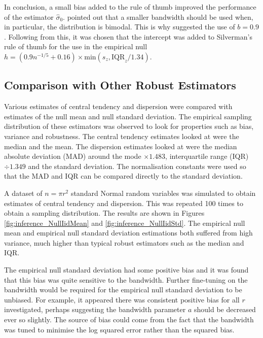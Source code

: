 In conclusion, a small bias added to the rule of thumb improved the performance of the estimator $\widehat{\sigma}_0$. \cite{silverman1986density} pointed out that a smaller bandwidth should be used when, in particular, the distribution is bimodal. This is why \cite{silverman1986density} suggested the use of $b=0.9$. Following from this, it was chosen that the intercept was added to Silverman's rule of thumb for the use in the empirical null $h = \left(0.9n^{-1/5}+ 0.16\right) \times\text{min}\left(s_z,\text{IQR}_z/1.34\right)$.

\afterpage{\clearpage}
\subsection{Comparison with Other Robust Estimators}

Various estimates of central tendency and dispersion were compared with estimates of the null mean and null standard deviation. The empirical sampling distribution of these estimators was observed to look for properties such as bias, variance and robustness. The central tendency estimates looked at were the median and the mean. The dispersion estimates looked at were the median absolute deviation (MAD) around the mode $\times 1.483$, interquartile range (IQR) $\div 1.349$ and the standard deviation. The normalisation constants were used so that the MAD and IQR can be compared directly to the standard deviation.

A dataset of $n = \pi r^2$ standard Normal random variables was simulated to obtain estimates of central tendency and dispersion. This was repeated 100 times to obtain a sampling distribution. The results are shown in Figures \ref{fig:inference_NullIidMean} and \ref{fig:inference_NullIidStd}. The empirical null mean and empirical null standard deviation estimations both suffered from high variance, much higher than typical robust estimators such as the median and IQR.

The empirical null standard deviation had some positive bias and it was found that this bias was quite sensitive to the bandwidth. Further fine-tuning on the bandwidth would be required for the empirical null standard deviation to be unbiased. For example, it appeared there was consistent positive bias for all $r$ investigated, perhaps suggesting the bandwidth parameter $a$ should be decreased ever so slightly. The source of bias could come from the fact that the bandwidth was tuned to minimise the log squared error rather than the squared bias.

